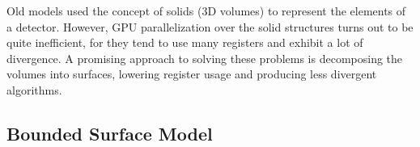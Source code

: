 \documentclass[12pt, a4paper]{article}
\begin{document}
Old models used the concept of solids (3D volumes) to represent the elements of a detector. However, GPU parallelization over the solid structures turns out to be quite inefficient, for they tend to use many registers and exhibit a lot of divergence. A promising approach to solving these problems is decomposing the volumes into surfaces, lowering register usage and producing less divergent algorithms.


\subsection{Bounded Surface Model}
\end{document}
